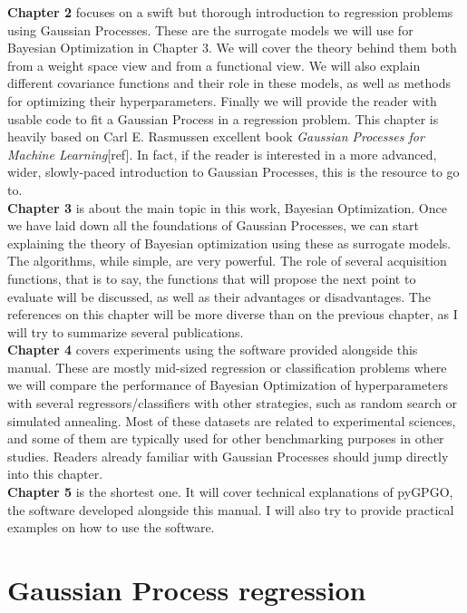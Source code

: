 \documentclass[10pt,a4paper,twoside]{book}
\begin{document}
\textbf{Chapter 2} focuses on a swift but thorough introduction to regression problems using Gaussian Processes. These are the surrogate models we will use for Bayesian Optimization in Chapter 3. We will cover the theory behind them both from a weight space view and from a functional view. We will also explain different covariance functions and their role in these models, as well as methods for optimizing their hyperparameters. Finally we will provide the reader with usable code to fit a Gaussian Process in a regression problem. This chapter is heavily based on Carl E. Rasmussen excellent book \textit{Gaussian Processes for Machine Learning}[ref]. In fact, if the reader is interested in a more advanced, wider, slowly-paced introduction to Gaussian Processes, this is the resource to go to. \\

\textbf{Chapter 3} is about the main topic in this work, Bayesian Optimization. Once we have laid down all the foundations of Gaussian Processes, we can start explaining the theory of Bayesian optimization using these as surrogate models. The algorithms, while simple, are very powerful. The role of several acquisition functions, that is to say, the functions that will propose the next point to evaluate will be discussed, as well as their advantages or disadvantages. The references on this chapter will be more diverse than on the previous chapter, as I will try to summarize several publications.\\

\textbf{Chapter 4} covers experiments using the software provided alongside this manual. These are mostly mid-sized regression or classification problems where we will compare the performance of Bayesian Optimization of hyperparameters with several regressors/classifiers with other strategies, such as random search or simulated annealing. Most of these datasets are related to experimental sciences, and some of them are typically used for other benchmarking purposes in other studies. Readers already familiar with Gaussian Processes should jump directly into this chapter.\\

\textbf{Chapter 5} is the shortest one. It will cover technical explanations of pyGPGO, the software developed alongside this manual. I will also try to provide practical examples on how to use the software.

\chapter{Gaussian Process regression}
\end{document}
